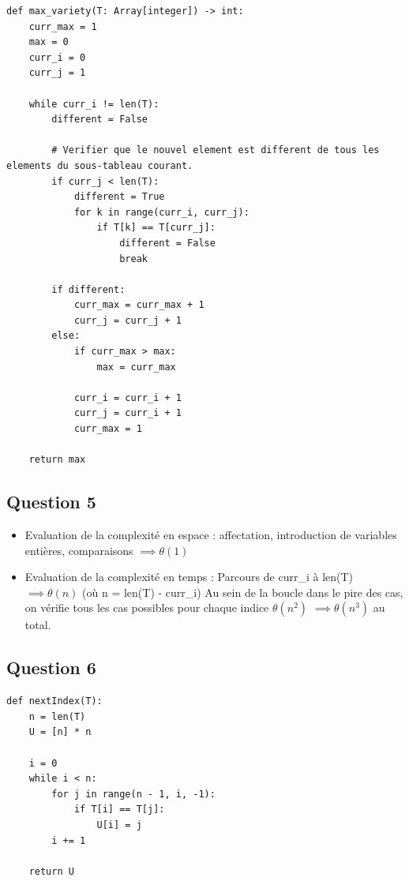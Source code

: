 \documentclass{article}
\begin{document}
\begin{lstlisting}[label=python, caption={max\_variety}]
def max_variety(T: Array[integer]) -> int:
    curr_max = 1
    max = 0
    curr_i = 0
    curr_j = 1

    while curr_i != len(T):
        different = False

        # Verifier que le nouvel element est different de tous les elements du sous-tableau courant.
        if curr_j < len(T):
            different = True
            for k in range(curr_i, curr_j):
                if T[k] == T[curr_j]:
                    different = False
                    break

        if different:
            curr_max = curr_max + 1
            curr_j = curr_j + 1
        else:
            if curr_max > max:
                max = curr_max

            curr_i = curr_i + 1
            curr_j = curr_i + 1
            curr_max = 1

    return max
\end{lstlisting}

\subsection*{Question 5}

\begin{itemize}
    \item Evaluation de la complexité en espace : 
    \subitem affectation, introduction de variables entières, comparaisons $ \implies \theta(1) $
    \item Evaluation de la complexité en temps : 
    \subitem Parcours de curr\_i à len(T) $ \implies \theta(n) $ (où n = len(T) - curr\_i) 
    \subitem Au sein de la boucle dans le pire des cas, on vérifie tous les cas possibles pour chaque indice $\theta(n^2)$ 
    \subitem $ \implies \theta(n^3) $ au total. 
\end{itemize}

\subsection*{Question 6}

\begin{lstlisting}[label=python, caption={\textit{nextIndex}}]
def nextIndex(T):
    n = len(T)
    U = [n] * n

    i = 0
    while i < n:
        for j in range(n - 1, i, -1):
            if T[i] == T[j]:
                U[i] = j
        i += 1

    return U
\end{lstlisting}
\end{document}
